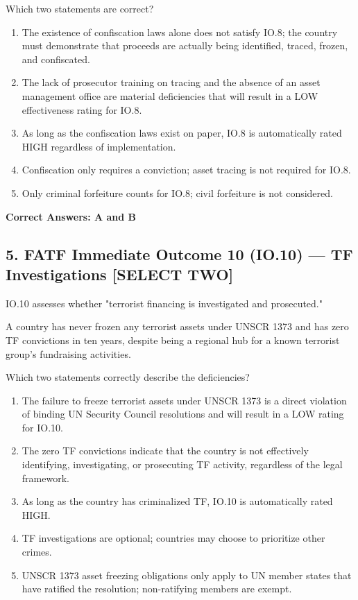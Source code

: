 \documentclass[11pt,a4paper]{article}
\begin{document}
	Which two statements are correct?
	
	\begin{enumerate}[label=\Alph*.]
		\item The existence of confiscation laws alone does not satisfy IO.8; the country must demonstrate that proceeds are actually being identified, traced, frozen, and confiscated.
		\item The lack of prosecutor training on tracing and the absence of an asset management office are material deficiencies that will result in a LOW effectiveness rating for IO.8.
		\item As long as the confiscation laws exist on paper, IO.8 is automatically rated HIGH regardless of implementation.
		\item Confiscation only requires a conviction; asset tracing is not required for IO.8.
		\item Only criminal forfeiture counts for IO.8; civil forfeiture is not considered.
	\end{enumerate}
	
	\textbf{Correct Answers: A and B}
	
	\subsection{5. FATF Immediate Outcome 10 (IO.10) — TF Investigations \textnormal{[SELECT TWO]}}
	
	IO.10 assesses whether "terrorist financing is investigated and prosecuted."
	
	A country has never frozen any terrorist assets under UNSCR 1373 and has zero TF convictions in ten years, despite being a regional hub for a known terrorist group's fundraising activities.
	
	Which two statements correctly describe the deficiencies?
	
	\begin{enumerate}[label=\Alph*.]
		\item The failure to freeze terrorist assets under UNSCR 1373 is a direct violation of binding UN Security Council resolutions and will result in a LOW rating for IO.10.
		\item The zero TF convictions indicate that the country is not effectively identifying, investigating, or prosecuting TF activity, regardless of the legal framework.
		\item As long as the country has criminalized TF, IO.10 is automatically rated HIGH.
		\item TF investigations are optional; countries may choose to prioritize other crimes.
		\item UNSCR 1373 asset freezing obligations only apply to UN member states that have ratified the resolution; non-ratifying members are exempt.
	\end{enumerate}
	
\end{document}
